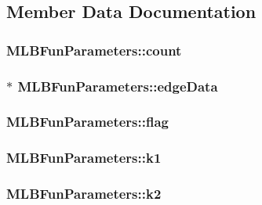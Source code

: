 \subsection{Member Data Documentation}
\hypertarget{structMLBFunParameters_a3bde90af55aad6097d41a322c89f3578}{
\subsubsection[{count}]{ {\bf MLBFunParameters::count}}}
\label{structMLBFunParameters_a3bde90af55aad6097d41a322c89f3578}
\hypertarget{structMLBFunParameters_a877290c3746a4a1443e312d225dc6963}{
\subsubsection[{edgeData}]{$\ast$ {\bf MLBFunParameters::edgeData}}}
\label{structMLBFunParameters_a877290c3746a4a1443e312d225dc6963}
\hypertarget{structMLBFunParameters_a7e2c8948155a41ba59c48aa27e78c50a}{
\subsubsection[{flag}]{ {\bf MLBFunParameters::flag}}}
\label{structMLBFunParameters_a7e2c8948155a41ba59c48aa27e78c50a}
\hypertarget{structMLBFunParameters_acc4e1b0ab4700da0f0a68a617209aebb}{
\subsubsection[{k1}]{ {\bf MLBFunParameters::k1}}}
\label{structMLBFunParameters_acc4e1b0ab4700da0f0a68a617209aebb}
\hypertarget{structMLBFunParameters_ae30f1ae18cf7dc38b28d8dcacfe57eff}{
\subsubsection[{k2}]{ {\bf MLBFunParameters::k2}}}

